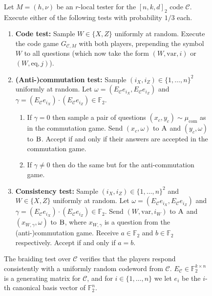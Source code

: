 \documentclass[11pt]{article}
\theoremstyle{definition}
\newcommand{\code}{\mathscr{C}}
\newcommand{\field}{\mathbb{F}_2}
\newcommand{\F}{\ensuremath{\mathbb{F}}}
\newcommand{\cc}{\mathrm{com}}
\newcommand{\eq}{\mathrm{eq}}
\newcommand{\var}{\mathrm{var}}
\newcommand{\labelstyle}[1]{\ensuremath{\textsc{#1}}\xspace}
\newcommand{\alice}{\labelstyle{A}}
\newcommand{\bob}{\labelstyle{B}}
\newenvironment{gamespec}{
  \begin{mdframed}[style=figstyle]}{
  \end{mdframed}}
\begin{document}
\begin{figure}[!htbp]
  \centering
  \begin{gamespec}
Let $M=(h,\nu)$ be an $r$-local tester for the $[n,k,d]_2$ code $\code$.  Execute either of the following tests with probability $1/3$ each. 
    \begin{enumerate}
      \setlength\itemsep{1pt}
    \item \textbf{Code test:} Sample $W\in \{X,Z\}$ uniformly at random. Execute the code game $G_{\code,M}$ with both players, prepending the symbol $W$ to all questions (which now take the form $(W,\var,i)$ or $(W,\eq,j)$). 
		
    \item \textbf{(Anti-)commutation test:} Sample $(i_X,i_Z)\in \{1,\ldots,n\}^2 $ uniformly at random. Let $\omega = (E_\code e_{i_X}, E_\code e_{i_Z})$ and $\gamma =  (E_\code e_{i_X}) \cdot(E_\code e_{i_Z}) \in \field$. 
		\begin{enumerate} 
		\item If $\gamma=0$ then sample a pair of questions $(x_c,y_c)\sim\mu_\cc$ as in the commutation game. Send $(x_c,\omega)$ to $\alice$ and $(y_c,\omega)$ to $\bob$. Accept if and only if their answers are accepted in the commutation game. 
		\item If $\gamma\neq 0$ then do the same but for the anti-commutation game. 
		\end{enumerate} 
		 \item \textbf{Consistency test:} Sample $(i_X,i_Z)\in \{1,\ldots,n\}^2 $ and $W\in \{X,Z\}$ uniformly at random. Let $\omega=(E_\code e_{i_X}, E_\code e_{i_Z})$ and $\gamma = (E_\code e_{i_X}) \cdot(E_\code e_{i_Z}) \in \field$. Send $(W,\var,i_W)$ to $\alice$ and $(x_{W,\gamma},\omega)$ to $\bob$, where $x_{W,\gamma}$ is a question from the (anti-)commutation game. Receive $a\in \field$ and $b\in \field$ respectively. Accept if and only if $a=b$. 
    \end{enumerate}
  \end{gamespec}
  \caption{The braiding test over $\code$ verifies that the players respond consistently with a uniformly random codeword from $\code$. $E_\code \in \F_2^{k\times n}$ is a generating matrix for $\code$, and for $i\in\{1,\ldots,n\}$ we let $e_i$ be the $i$-th canonical basis vector of $\F_2^n$.}
  \label{fig:braiding-test}
\end{figure}
\end{document}

